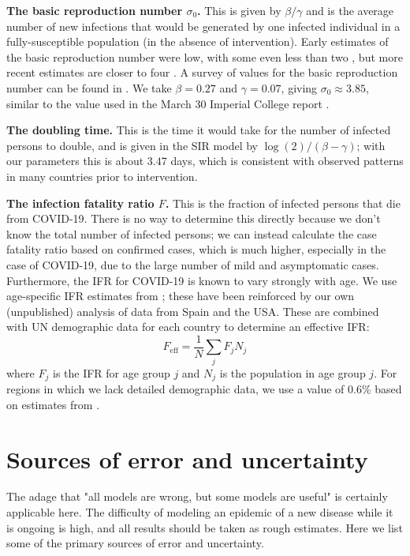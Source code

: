 \documentclass[english,12pt,letter]{article}
\newcommand{\Rnot}{\sigma_0}
\newcommand{\ifr}{F}
\begin{document}
{\bf The basic reproduction number $\Rnot$.}  This is given by $\beta/\gamma$ and
is the average number of new infections that would be generated by one
infected individual in a fully-susceptible population (in the absence of
intervention).  Early estimates of the basic reproduction number were
low, with some even less than two \cite{wu2020estimating},
but more recent estimates are closer to four \cite{siwiak2020single}.
A survey of values for the basic reproduction number can be
found in \cite{liu2020reproductive}.  We take $\beta=0.27$ and
$\gamma=0.07$, giving $\Rnot\approx3.85$, similar to the value used in the
March 30 Imperial College report \cite{flaxman2020report}.

{\bf The doubling time.}  This is the time it would take for the number of
infected persons to double, and is given in the SIR model by $\log(2)/(\beta-\gamma)$;
with our parameters this is about $3.47$ days, which is consistent with
observed patterns in many countries prior to intervention.

{\bf The infection fatality ratio $\ifr$.}  This is the fraction of
infected persons that die from COVID-19.  There is no way to determine
this directly because we don't know the total number of infected
persons; we can instead calculate the case fatality ratio based on
confirmed cases, which is much higher, especially in the case of COVID-19,
due to the large number of mild and asymptomatic cases.
Furthermore, the IFR for COVID-19 is known to vary strongly with age.
We use age-specific IFR estimates from \cite{verity2020estimates};
these have been reinforced by our own (unpublished) analysis of data
from Spain and the USA.  These are
combined with UN demographic data for each country to determine an
effective IFR:
$$
    \ifr_\text{eff} = \frac{1}{N} \sum_j \ifr_j N_j
$$
where $\ifr_j$ is the IFR for age group $j$ and $N_j$ is the
population in age group $j$.
For regions in which we lack detailed demographic data, 
we use a value of 0.6\% based on estimates from 
\cite{russell2020estimating,wu2020estimating,verity2020estimates}.

\section{Sources of error and uncertainty}
The adage that "all models are wrong, but some models are useful"
is certainly applicable here.  The difficulty of modeling an epidemic
of a new disease while it is ongoing is high, and all results should
be taken as rough estimates.  Here we list some of the primary sources
of error and uncertainty.
\end{document}
